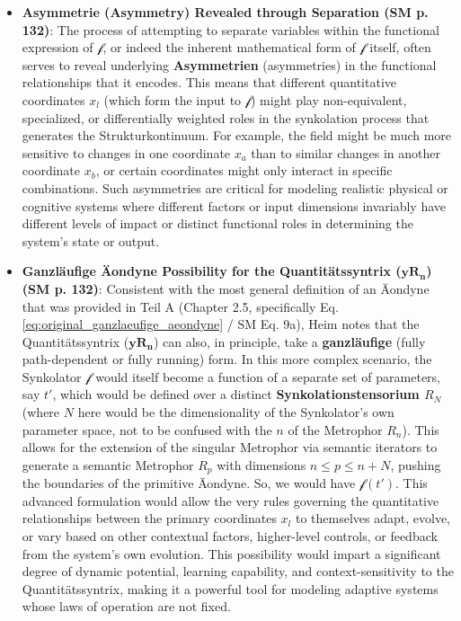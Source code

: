 \documentclass[12pt]{article}
\newcommand{\quantitaetssyntrix}{\bm{yR_n}}
\newcommand{\funktionaloperator}{\mathcal{f}}
\begin{document}
\begin{itemize}
    \item \textbf{Asymmetrie (Asymmetry) Revealed through Separation (SM p. 132)}:
    The process of attempting to separate variables within the functional expression of \( \funktionaloperator \), or indeed the inherent mathematical form of \( \funktionaloperator \) itself, often serves to reveal underlying \textbf{Asymmetrien} (asymmetries) in the functional relationships that it encodes. This means that different quantitative coordinates \( x_l \) (which form the input to \( \funktionaloperator \)) might play non-equivalent, specialized, or differentially weighted roles in the synkolation process that generates the Strukturkontinuum. For example, the field might be much more sensitive to changes in one coordinate \( x_a \) than to similar changes in another coordinate \( x_b \), or certain coordinates might only interact in specific combinations. Such asymmetries are critical for modeling realistic physical or cognitive systems where different factors or input dimensions invariably have different levels of impact or distinct functional roles in determining the system's state or output.
    \item \textbf{Ganzläufige Äondyne Possibility for the Quantitätssyntrix (\(\quantitaetssyntrix\)) (SM p. 132)}:
    Consistent with the most general definition of an Äondyne that was provided in Teil A (Chapter 2.5, specifically Eq. \eqref{eq:original_ganzlaeufige_aeondyne} / SM Eq. 9a), Heim notes that the Quantitätssyntrix (\(\quantitaetssyntrix\)) can also, in principle, take a \textbf{ganzläufige} (fully path-dependent or fully running) form. In this more complex scenario, the Synkolator \( \funktionaloperator \) would itself become a function of a separate set of parameters, say \( t' \), which would be defined over a distinct \textbf{Synkolationstensorium \( R_N \)} (where \( N \) here would be the dimensionality of the Synkolator's own parameter space, not to be confused with the \(n\) of the Metrophor \(R_n\)). This allows for the extension of the singular Metrophor via semantic iterators to generate a semantic Metrophor $R_p$ with dimensions $n \le p \le n+N$, pushing the boundaries of the primitive Äondyne. So, we would have \( \funktionaloperator(t') \). This advanced formulation would allow the very rules governing the quantitative relationships between the primary coordinates \( x_l \) to themselves adapt, evolve, or vary based on other contextual factors, higher-level controls, or feedback from the system's own evolution. This possibility would impart a significant degree of dynamic potential, learning capability, and context-sensitivity to the Quantitätssyntrix, making it a powerful tool for modeling adaptive systems whose laws of operation are not fixed.
\end{itemize}
\end{document}

